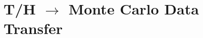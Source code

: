 \documentclass[10pt]{beamer}
\begin{document}

\section{T/H \(\rightarrow\) Monte Carlo Data Transfer}
\end{document}
